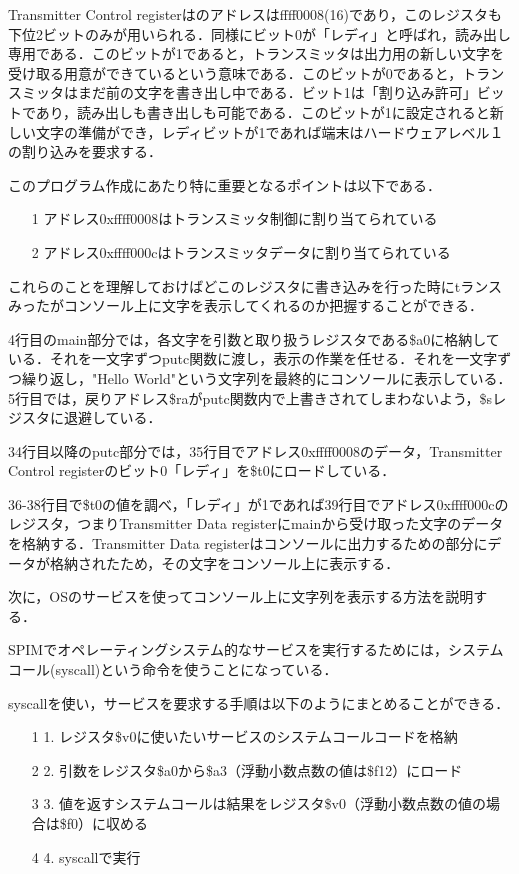 \documentclass[a4j]{jarticle}
\begin{document}
Transmitter Control registerはのアドレスはffff0008(16)であり，このレジスタも下位2ビットのみが用いられる．同様にビット0が「レディ」と呼ばれ，読み出し専用である．このビットが1であると，トランスミッタは出力用の新しい文字を受け取る用意ができているという意味である．このビットが0であると，トランスミッタはまだ前の文字を書き出し中である．ビット1は「割り込み許可」ビットであり，読み出しも書き出しも可能である．このビットが1に設定されると新しい文字の準備ができ，レディビットが1であれば端末はハードウェアレベル１の割り込みを要求する．

このプログラム作成にあたり特に重要となるポイントは以下である．

\begin{itemize}
\item[1]アドレス0xffff0008はトランスミッタ制御に割り当てられている
\item[2]アドレス0xffff000cはトランスミッタデータに割り当てられている
\end{itemize}

これらのことを理解しておけばどこのレジスタに書き込みを行った時にtランスみったがコンソール上に文字を表示してくれるのか把握することができる．

4行目のmain部分では，各文字を引数と取り扱うレジスタである\$a0に格納している．それを一文字ずつputc関数に渡し，表示の作業を任せる．それを一文字ずつ繰り返し，"Hello World"という文字列を最終的にコンソールに表示している．5行目では，戻りアドレス\$raがputc関数内で上書きされてしまわないよう，\$sレジスタに退避している．

34行目以降のputc部分では，35行目でアドレス0xffff0008のデータ，Transmitter Control registerのビット0「レディ」を\$t0にロードしている．

36-38行目で\$t0の値を調べ，「レディ」が1であれば39行目でアドレス0xffff000cのレジスタ，つまりTransmitter Data registerにmainから受け取った文字のデータを格納する．Transmitter Data registerはコンソールに出力するための部分にデータが格納されたため，その文字をコンソール上に表示する．

次に，OSのサービスを使ってコンソール上に文字列を表示する方法を説明する．

SPIMでオペレーティングシステム的なサービスを実行するためには，システムコール(syscall)という命令を使うことになっている．

syscallを使い，サービスを要求する手順は以下のようにまとめることができる．

\begin{itemize}
\item[1]1. レジスタ\$v0に使いたいサービスのシステムコールコードを格納
\item[2]2. 引数をレジスタ\$a0から\$a3（浮動小数点数の値は\$f12）にロード
\item[3]3. 値を返すシステムコールは結果をレジスタ\$v0（浮動小数点数の値の場合は\$f0）に収める
\item[4]4. syscallで実行
\end{itemize}
\end{document}
